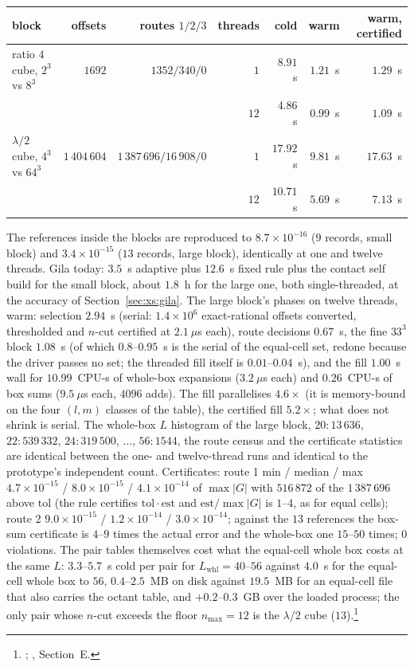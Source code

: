 \begin{center}\footnotesize
\begin{tabular}{@{}lrrrrrr@{}}
\toprule
block & offsets & routes $1/2/3$ & threads & cold & warm & warm, certified\\
\midrule
ratio $4$ cube, $2^3$ vs $8^3$ & $1692$ & $1352/340/0$ & $1$ & $8.91$~s & $1.21$~s & $1.29$~s\\
 & & & $12$ & $4.86$~s & $0.99$~s & $1.09$~s\\
$\lambda/2$ cube, $4^3$ vs $64^3$ & $1\,404\,604$ & $1\,387\,696/16\,908/0$ & $1$ & $17.92$~s & $9.81$~s & $17.63$~s\\
 & & & $12$ & $10.71$~s & $5.69$~s & $7.13$~s\\
\bottomrule
\end{tabular}
\end{center}

\noindent
The references inside the blocks are reproduced to $8.7\times10^{-16}$ ($9$ records, small
block) and $3.4\times10^{-15}$ ($13$ records, large block), identically at one and twelve
threads. Gila today: $3.5$~s adaptive plus $12.6$~s fixed rule plus the contact self build for the
small block, about $1.8$~h for the large one, both single-threaded, at the accuracy of
Section~\ref{sec:xs:gila}. The large block's phases on twelve threads, warm: selection
$2.94$~s (serial: $1.4\times10^{6}$ exact-rational offsets converted, thresholded and
$n$-cut certified at $2.1~\mu$s each), route decisions $0.67$~s, the fine $33^3$ block
$1.08$~s (of which $0.8$--$0.95$~s is the serial  of the equal-cell set,
redone because the driver passes no set; the threaded fill itself is $0.01$--$0.04$~s), and
the fill $1.00$~s wall for $10.99$~CPU-s of whole-box expansions ($3.2~\mu$s each) and
$0.26$~CPU-s of box sums ($9.5~\mu$s each, $4096$ adds). The fill parallelises $4.6\times$
(it is memory-bound on the four $(l,m)$ classes of the table), the certified fill
$5.2\times$; what does not shrink is serial. The whole-box $L$ histogram of the large
block, $20{:}13\,636$, $22{:}539\,332$, $24{:}319\,500$, $\dots$, $56{:}1544$, the route
census and the certificate statistics are identical between the one- and twelve-thread runs
and identical to the prototype's independent count. Certificates: route 1 min / median / max
$4.7\times10^{-15}$ / $8.0\times10^{-15}$ / $4.1\times10^{-14}$ of $\max|G|$ with
$516\,872$ of the $1\,387\,696$ above $\mathrm{tol}$ (the rule certifies
$\mathrm{tol}\cdot\mathrm{est}$ and $\mathrm{est}/\max|G|$ is $1$--$4$, as for equal cells);
route 2 $9.0\times10^{-15}$ / $1.2\times10^{-14}$ / $3.0\times10^{-14}$; against the $13$
references the box-sum certificate is $4$--$9$ times the actual error and the whole-box one
$15$--$50$ times; $0$ violations. The pair tables themselves cost what the equal-cell whole
box costs at the same $L$: $3.3$--$5.7$~s cold per pair for $L_{\mathrm{whl}} = 40$--$56$
against $4.0$~s for the equal-cell whole box to $56$, $0.4$--$2.5$~MB on disk against
$19.5$~MB for an equal-cell file that also carries the octant table, and $+0.2$--$0.3$~GB
over the loaded process; the only pair whose $n$-cut exceeds the floor $n_{\max} = 12$ is the
$\lambda/2$ cube ($13$).\footnote{; ,
Section~E.}

